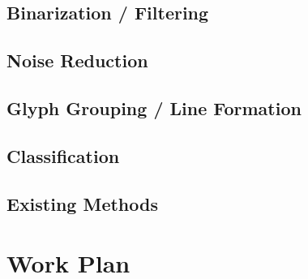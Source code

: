 \documentclass[12pt,a4paper,final]{article}
\begin{document}
\subsection{Binarization / Filtering}
\todo{}

\subsection{Noise Reduction}
\todo{}

\subsection{Glyph Grouping / Line Formation}
\todo{}

\subsection{Classification}
\todo{}

\subsection{Existing Methods}
\todo{}

\newpage
\section{Work Plan}
\todo{}

\printbibliography[heading=bibintoc, title={References}]
\end{document}
